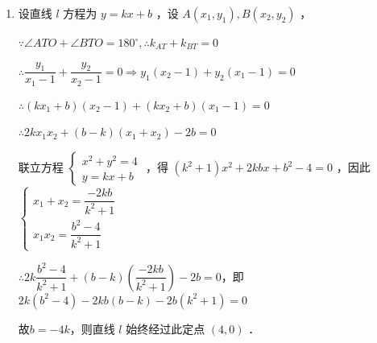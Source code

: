 \begin{enumerate}
\begin{jieda}
\begin{enumerate}
            
            \item 设直线 $l$ 方程为 $y=k x+b$ ，设 ${A}\left({x}_1, {y}_1\right), {B}\left({x}_2, {y}_2\right)$ ，
            
            $\because \angle A T O+\angle B T O=180^{\circ}, \therefore k_{A T}+k_{B T}=0$
            
            $\therefore \dfrac{y_1}{x_1-1}+\dfrac{y_2}{x_2-1}=0 \Longrightarrow y_1\left(x_2-1\right)+y_2\left(x_1-1\right)=0$
             
            $\therefore \left(k x_1+b\right)\left(x_2-1\right)+\left(k x_2+b\right)\left(x_1-1\right)=0$
            
            $\therefore 2 k x_1 x_2+(b-k)\left(x_1+x_2\right)-2 b=0$
            
            
            联立方程 $\left\{\begin{array}{l}x^2+y^2=4 \\ y=k x+b\end{array}\right.$ ，得 $\left(k^2+1\right) x^2+2 k b x+b^2-4=0$ ，因此$\left\{\begin{array}{l}
                 x_1+x_2=\dfrac{-2 k b}{k^2+1} \\
                 x_1 x_2=\dfrac{b^2-4}{k^2+1}
            \end{array}\right.$

            $\therefore 2 k \dfrac{b^2-4}{k^2+1}+(b-k)\left(\dfrac{-2 k b}{k^2+1}\right)-2 b=0$，即$2 k\left(b^2-4\right)-2 k b(b-k)-2 b\left(k^2+1\right)=0$

            故$b = -4k$，则直线 $l$ 始终经过此定点 $(4,0)$ ．
            
        \end{enumerate}
    \end{jieda}
    

\end{enumerate}
